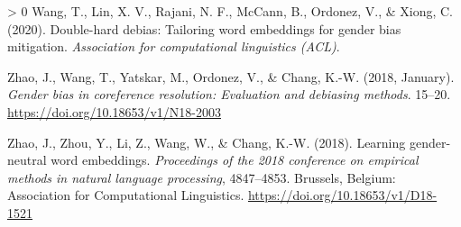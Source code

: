 \documentclass[
  english,
  man,floatsintext]{apa6}
\newlength{\cslhangindent}
\newenvironment{CSLReferences}[3] %
 {%
  \setlength{\parindent}{0pt}
  \ifodd #1 \everypar{\setlength{\hangindent}{\cslhangindent}}\ignorespaces\fi
  \ifnum #2 > 0
  \setlength{\parskip}{#3\baselineskip}
  \fi
 }%
 {}
\begin{document}
\begin{CSLReferences}{1}{0}
\leavevmode\hypertarget{ref-wang_2020}{}%
Wang, T., Lin, X. V., Rajani, N. F., McCann, B., Ordonez, V., \& Xiong, C. (2020). Double-hard debias: Tailoring word embeddings for gender bias mitigation. \emph{Association for computational linguistics (ACL)}.

\leavevmode\hypertarget{ref-zhao_2018a}{}%
Zhao, J., Wang, T., Yatskar, M., Ordonez, V., \& Chang, K.-W. (2018, January). \emph{Gender bias in coreference resolution: Evaluation and debiasing methods}. 15--20. \url{https://doi.org/10.18653/v1/N18-2003}

\leavevmode\hypertarget{ref-zhao_2018b}{}%
Zhao, J., Zhou, Y., Li, Z., Wang, W., \& Chang, K.-W. (2018). Learning gender-neutral word embeddings. \emph{Proceedings of the 2018 conference on empirical methods in natural language processing}, 4847--4853. Brussels, Belgium: Association for Computational Linguistics. \url{https://doi.org/10.18653/v1/D18-1521}

\end{CSLReferences}

\endgroup
\end{document}
